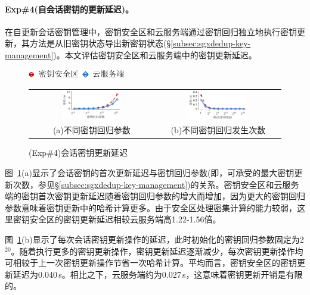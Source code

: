 \paragraph*{Exp\#4(自会话密钥的更新延迟)。}在自更新会话密钥管理中，密钥安全区和云服务端通过密钥回归独立地执行密钥更新，其方法是从旧密钥状态导出新密钥状态(\S\ref{subsec:sgxdedup-key-management})。本文评估密钥安全区和云服务端中的密钥更新延迟。

\begin{figure}[!htb]
    \centering
    \includegraphics[height=11pt]{pic/sgxdedup/plot/exp_a5/expa5_keyRegression_time_legend.pdf}
    \begin{tabular}{@{\ }c@{\ }c}
        \includegraphics[width=0.49\textwidth]{pic/sgxdedup/plot/exp_a5/expa5_keyRegression_time.pdf} & 
        \includegraphics[width=0.49\textwidth]{pic/sgxdedup/plot/exp_a5/expa5_keyRegression_time_default.pdf} \\
        \mbox{\small (a)不同密钥回归参数}                                                             & 
        \mbox{\small (b)不同密钥回归发生次数}
    \end{tabular}
    \caption{(Exp\#4)会话密钥更新延迟}
    \label{fig:sgxdedup-rekeyingLatency}
\end{figure}

图~\ref{fig:sgxdedup-rekeyingLatency}(a)显示了会话密钥的首次更新延迟与密钥回归参数(即，可承受的最大密钥更新次数，参见\S\ref{subsec:sgxdedup-key-management})的关系。密钥安全区和云服务端的密钥首次密钥更新延迟随着密钥回归参数的增大而增加，因为更大的密钥回归参数意味着密钥更新中的哈希计算更多。由于安全区处理密集计算的能力较弱，这里密钥安全区的密钥更新延迟相较云服务端高1.22-1.56倍。

图~\ref{fig:sgxdedup-rekeyingLatency}(b)显示了每次会话密钥更新操作的延迟，此时初始化的密钥回归参数固定为2$^{20}$。随着执行更多的密钥更新操作，密钥更新延迟逐渐减少，每次密钥更新操作均可相较于上一次密钥更新操作节省一次哈希计算。平均而言，密钥安全区的密钥更新延迟为0.040\,s。相比之下，云服务端约为0.027\,s，这意味着密钥更新开销是有限的。

